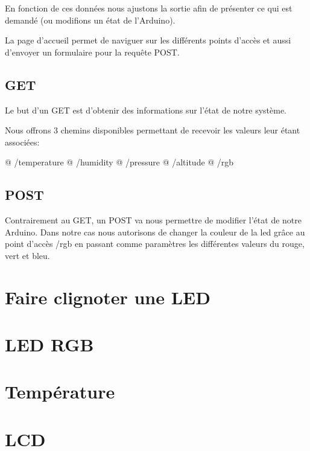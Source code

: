 \documentclass{report}
\begin{document}
		En fonction de ces données nous ajustons la sortie afin de présenter ce qui est demandé (ou modifions un état de l'Arduino).
		
		La page d'accueil permet de naviguer sur les différents points d'accès et aussi d'envoyer un formulaire pour la requête POST.
		
		
		\section{GET}
			Le but d'un GET est d'obtenir des informations sur l'état de notre système.
			
			Nous offrons 3 chemins disponibles permettant de recevoir les valeurs leur étant associées:
			\begin{easylist}
				@ /temperature
				@ /humidity
				@ /pressure
				@ /altitude
				@ /rgb
			\end{easylist}
		
		\section{POST}
			Contrairement au GET, un POST va nous permettre de modifier l'état de notre Arduino.
			Dans notre cas nous autorisons de changer la couleur de la led grâce au point d'accès /rgb en passant comme paramètres les différentes valeurs du rouge, vert et bleu.
  		
\appendix
	\chapter{Faire clignoter une LED\label{code:led}}
		
			
	\chapter{LED RGB\label{code:rgb}}
		
			
	\chapter{Température\label{code:temp}}
		
			
	\chapter{LCD\label{code:lcd}}
		
\end{document}
